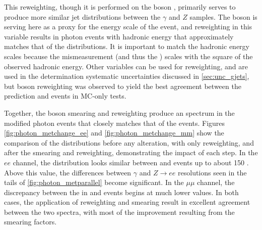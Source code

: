 This reweighting, though it is performed on the boson \pt, primarily serves to produce more similar jet distributions between the $\gamma$ and $Z$ samples. The boson \pt is serving here as a proxy for the energy scale of the event, and reweighting in this variable results in photon events with hadronic energy that approximately matches that of the \dyjets distributions. It is important to match the hadronic energy scales because the mismeasurement (and thus the \met) scales with the square of the observed hadronic energy. Other variables can be used for reweighting, and are used in the determination systematic uncertainties discussed in \autoref{sec:unc_gjets}, but boson \pt reweighting was observed to yield the best agreement between the prediction and \dyjets events in \ac{MC}-only tests.


Together, the boson smearing and \pt reweighting produce an \met spectrum in the modified photon events that closely matches that of the \dyjets events. Figures \ref{fig:photon_metchange_ee} and \ref{fig:photon_metchange_mm} show the comparison of the \met distributions before any alteration, with only \pt reweighting, and after the smearing and reweighting, demonstrating the impact of each step. In the $ee$ channel, the \met distribution looks similar between \dyjets and \gjets events up to about 150 \gev. Above this value, the differences between $\gamma$ and $Z\rightarrow ee$ resolutions seen in the tails of \autoref{fig:photon_metparallel} become significant. In the $\mu\mu$ channel, the discrepancy between the \met in \dyjets and \gjets events begins at much lower values. In both cases, the application of \pt reweighting and smearing result in excellent agreement between the two \met spectra, with most of the improvement resulting from the smearing factors. 

